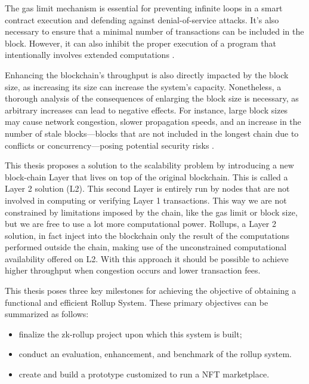 The gas limit mechanism is essential for preventing infinite loops in a smart contract execution and defending against denial-of-service attacks. It's also necessary to ensure that a minimal number of transactions can be included in the block. However, it can also inhibit the proper execution of a program that intentionally involves extended computations \cite{wood_ethereum_nodate}.

Enhancing the blockchain's throughput is also directly impacted by the block size, as increasing its size can increase the system's capacity. Nonetheless, a thorough analysis of the consequences of enlarging the block size is necessary, as arbitrary increases can lead to negative effects. For instance, large block sizes may cause network congestion, slower propagation speeds, and an increase in the number of stale blocks—blocks that are not included in the longest chain due to conflicts or concurrency—posing potential security risks \cite{gervais_security_2016}.

This thesis proposes a solution to the scalability problem by introducing a new block-chain Layer that lives on top of the original blockchain. This is called a Layer 2 solution (L2). This second Layer is entirely run by nodes that are not involved in computing or verifying Layer 1 transactions. This way we are not constrained by limitations imposed by the chain, like the gas limit or block size, but we are free to use a lot more computational power. Rollups, a Layer 2 solution, in fact inject into the blockchain only the result of the computations performed outside the chain, making use of the unconstrained computational availability offered on L2. With this approach it should be possible to achieve higher throughput when congestion occurs and lower transaction fees.

This thesis poses three key milestones for achieving the objective of obtaining a functional and efficient Rollup System. These primary objectives can be summarized as follows:
\begin{itemize}
    \vspace{-0.11in}
    \item finalize the zk-rollup project upon which this system is built;
          \vspace{-0.11in}
    \item conduct an evaluation, enhancement, and benchmark of the rollup system.
          \vspace{-0.11in}
    \item create and build a prototype customized to run a NFT marketplace.
\end{itemize}\

